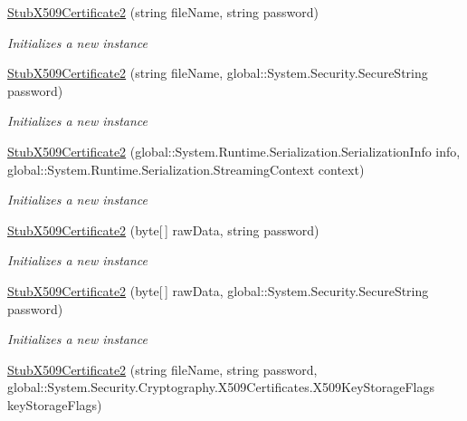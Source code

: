 \begin{DoxyCompactItemize}
\hyperlink{class_system_1_1_security_1_1_cryptography_1_1_x509_certificates_1_1_fakes_1_1_stub_x509_certificate2_aca497907103475cd1fbeae6b64e9981f}{Stub\-X509\-Certificate2} (string file\-Name, string password)
\begin{DoxyCompactList}\small\item\em Initializes a new instance\end{DoxyCompactList}\item 
\hyperlink{class_system_1_1_security_1_1_cryptography_1_1_x509_certificates_1_1_fakes_1_1_stub_x509_certificate2_a5c746d1c6d51cd527c2b8298c9f5ce9b}{Stub\-X509\-Certificate2} (string file\-Name, global\-::\-System.\-Security.\-Secure\-String password)
\begin{DoxyCompactList}\small\item\em Initializes a new instance\end{DoxyCompactList}\item 
\hyperlink{class_system_1_1_security_1_1_cryptography_1_1_x509_certificates_1_1_fakes_1_1_stub_x509_certificate2_a4351c38d886145d157dc087c3789ea3c}{Stub\-X509\-Certificate2} (global\-::\-System.\-Runtime.\-Serialization.\-Serialization\-Info info, global\-::\-System.\-Runtime.\-Serialization.\-Streaming\-Context context)
\begin{DoxyCompactList}\small\item\em Initializes a new instance\end{DoxyCompactList}\item 
\hyperlink{class_system_1_1_security_1_1_cryptography_1_1_x509_certificates_1_1_fakes_1_1_stub_x509_certificate2_afb438ea2b6da463b3a3f5a123d3b61ac}{Stub\-X509\-Certificate2} (byte\mbox{[}$\,$\mbox{]} raw\-Data, string password)
\begin{DoxyCompactList}\small\item\em Initializes a new instance\end{DoxyCompactList}\item 
\hyperlink{class_system_1_1_security_1_1_cryptography_1_1_x509_certificates_1_1_fakes_1_1_stub_x509_certificate2_a20de10691a5affb9c226d7b741f5d07f}{Stub\-X509\-Certificate2} (byte\mbox{[}$\,$\mbox{]} raw\-Data, global\-::\-System.\-Security.\-Secure\-String password)
\begin{DoxyCompactList}\small\item\em Initializes a new instance\end{DoxyCompactList}\item 
\hyperlink{class_system_1_1_security_1_1_cryptography_1_1_x509_certificates_1_1_fakes_1_1_stub_x509_certificate2_a4bdc6ca9ace27c054140958e35d5cf33}{Stub\-X509\-Certificate2} (string file\-Name, string password, global\-::\-System.\-Security.\-Cryptography.\-X509\-Certificates.\-X509\-Key\-Storage\-Flags key\-Storage\-Flags)

\end{DoxyCompactItemize}
